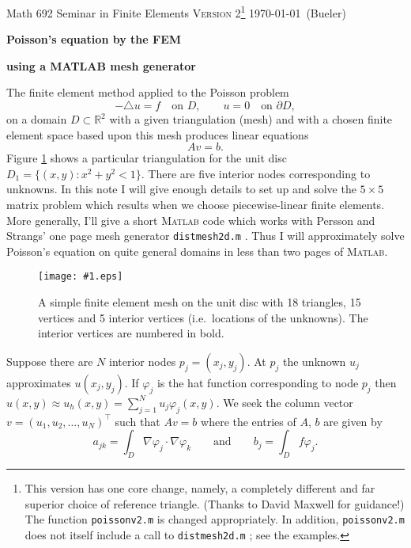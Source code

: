 \documentclass[12pt]{amsart}
\theoremstyle{definition}
\newcommand{\mtt}{\texttt}
\newcommand{\regfigure}[2]{\texttt{[image: \#1.eps]}}
\newcommand{\grad}{\nabla}
\newcommand{\lap}{\triangle}
\newcommand{\Matlab}{\textsc{Matlab}\xspace}
\newcommand{\RR}{\mathbb{R}}
\newcommand{\vf}{\varphi}
\begin{document}
\scriptsize \noindent Math 692 Seminar in Finite Elements \hfill \large \textsc{Version 2}\footnote{This version has one core change, namely, a completely different and far superior choice of reference triangle.  (Thanks to David Maxwell for guidance!)  The function \mtt{poissonv2.m} is changed appropriately.  In addition, \mtt{poissonv2.m} does not itself include a call to \mtt{distmesh2d.m} \cite{PerssonStrang}; see the examples.} \quad \scriptsize\today~(Bueler) 
\normalsize\bigskip

\Large\centerline{\textbf{Poisson's equation by the FEM}}
\centerline{\textbf{using a MATLAB mesh generator}}
\normalsize\bigskip\medskip

The finite element method \cite{Johnson} applied to the Poisson problem 
\begin{equation}\label{poisson}
-\lap u = f \quad\text{on } D, \qquad u=0 \quad\text{on } \partial D,
\end{equation}
on a domain $D\subset \RR^2$ with a given triangulation (mesh) and with a chosen finite element space based upon this mesh produces linear equations
    $$A v = b.$$
Figure \ref{fivedisc} shows a particular triangulation for the unit disc $D_1=\{(x,y):x^2+y^2<1\}$.  There are five interior nodes corresponding to unknowns.  In this note I will give enough details to set up and solve the $5\times 5$ matrix problem which results when we choose piecewise-linear finite elements.  More generally, I'll give a short \Matlab code which works with Persson and Strangs' one page mesh generator \texttt{distmesh2d.m} \cite{PerssonStrang}.  Thus I will approximately solve Poisson's equation on quite general domains in less than two pages of \Matlab.
    
\begin{figure}[h]
\regfigure{fivedisc}{3}
\caption{A simple finite element mesh on the unit disc with 18 triangles, 15 vertices and 5 interior vertices (i.e.~locations of the unknowns).  The interior vertices are numbered in bold.}\label{fivedisc}
\end{figure}

Suppose there are $N$ interior nodes $p_j=(x_j,y_j)$.  At $p_j$ the unknown $u_j$ approximates $u(x_j,y_j)$.  If $\vf_j$ is the hat function \cite[page 29]{Johnson} corresponding to node $p_j$ then $u(x,y)\approx u_h(x,y)=\sum_{j=1}^N u_j \vf_j(x,y)$. We seek the column vector $v=(u_1,u_2,\dots,u_N)^\top$ such that $Av=b$ where the entries of $A$, $b$ are given by
    $$a_{jk} = \int_D \grad \vf_j \cdot \grad \vf_k \qquad \text{and} \qquad b_j = \int_D f \vf_j.$$
\end{document}
